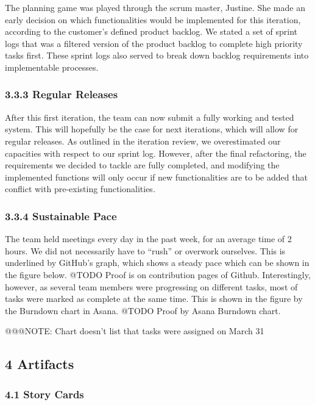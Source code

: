 \documentclass[]{article}
\begin{document}
The planning game was played through the scrum master, Justine. She made
an early decision on which functionalities would be implemented for this
iteration, according to the customer's defined product backlog. We
stated a set of sprint logs that was a filtered version of the product
backlog to complete high priority tasks first. These sprint logs also
served to break down backlog requirements into implementable processes.

\subsubsection{3.3.3 Regular Releases}\label{regular-releases}

After this first iteration, the team can now submit a fully working and
tested system. This will hopefully be the case for next iterations,
which will allow for regular releases. As outlined in the iteration
review, we overestimated our capacities with respect to our sprint log.
However, after the final refactoring, the requirements we decided to
tackle are fully completed, and modifying the implemented functions will
only occur if new functionalities are to be added that conflict with
pre-existing functionalities.

\subsubsection{3.3.4 Sustainable Pace}\label{sustainable-pace}

The team held meetings every day in the past week, for an average time
of 2 hours. We did not necessarily have to ``rush'' or overwork
ourselves. This is underlined by GitHub's graph, which shows a steady
pace which can be shown in the figure below. @TODO Proof is on
contribution pages of Github. Interestingly, however, as several team
members were progressing on different tasks, most of tasks were marked
as complete at the same time. This is shown in the figure by the
Burndown chart in Asana. @TODO Proof by Asana Burndown chart.

@@@NOTE: Chart doesn't list that tasks were assigned on March 31

\subsection{4 Artifacts}\label{artifacts}

\subsubsection{4.1 Story Cards}\label{story-cards}
\end{document}
